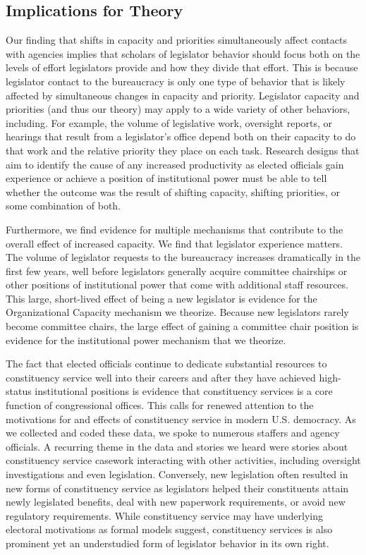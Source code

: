 \documentclass[12pt]{article}
\begin{document}
{%
\subsection{Implications for Theory}

Our finding that shifts in capacity and priorities simultaneously affect contacts with agencies implies that scholars of legislator behavior should focus both on the levels of effort legislators provide and how they divide that effort. This is because legislator contact to the bureaucracy is only one type of behavior that is likely affected by simultaneous changes in capacity and priority. Legislator capacity and priorities (and thus our theory) may apply to a wide variety of other behaviors, including. For example, the volume of legislative work, oversight reports, or hearings that result from a legislator's office depend both on their capacity to do that work and the relative priority they place on each task. Research designs that aim to identify the cause of any increased productivity as elected officials gain experience or achieve a position of institutional power must be able to tell whether the outcome was the result of shifting capacity, shifting priorities, or some combination of both. 

Furthermore, we find evidence for multiple mechanisms that contribute to the overall effect of increased capacity. We find that legislator experience matters. The volume of legislator requests to the bureaucracy increases dramatically in the first few years, well before legislators generally acquire committee chairships or other positions of institutional power that come with additional staff resources. This large, short-lived effect of being a new legislator is evidence for the Organizational Capacity mechanism we theorize. Because new legislators rarely become committee chairs, the large effect of gaining a committee chair position is evidence for the institutional power mechanism that we theorize. 

The fact that elected officials continue to dedicate substantial resources to constituency service well into their careers and after they have achieved high-status institutional positions is evidence that constituency services is a core function of congressional offices. This calls for renewed attention to the motivations for and effects of constituency service in modern U.S. democracy. As we collected and coded these data, we spoke to numerous staffers and agency officials. A recurring theme in the data and stories we heard were stories about constituency service casework interacting with other activities, including oversight investigations and even legislation. Conversely, new legislation often resulted in new forms of constituency service as legislators helped their constituents attain newly legislated benefits, deal with new paperwork requirements, or avoid new regulatory requirements. While constituency service may have underlying electoral motivations as formal models suggest, constituency services is also prominent yet an understudied form of legislator behavior in its own right. 

}
\end{document}
